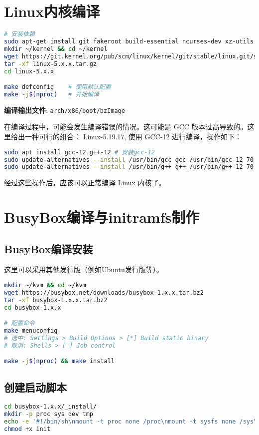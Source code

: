 \section{Linux内核编译}
\begin{lstlisting}[language=bash]
# 安装依赖
sudo apt-get install git fakeroot build-essential ncurses-dev xz-utils libssl-dev bc flex libelf-dev bison
mkdir ~/kernel && cd ~/kernel
wget https://git.kernel.org/pub/scm/linux/kernel/git/stable/linux.git/snapshot/linux-5.x.x.tar.gz
tar -xf linux-5.x.x.tar.gz
cd linux-5.x.x

make defconfig    # 使用默认配置
make -j$(nproc)   # 开始编译
\end{lstlisting}

\textbf{编译输出文件}: \texttt{arch/x86/boot/bzImage}

在编译过程中，可能会发生编译错误的情况。这可能是 GCC 版本过高导致的。这里给出一种可行的组合： Linux-5.19.17, 使用 GCC-12 进行编译，操作如下：

\begin{lstlisting}[language=bash]
sudo apt install gcc-12 g++-12 # 安装gcc-12
sudo update-alternatives --install /usr/bin/gcc gcc /usr/bin/gcc-12 70
sudo update-alternatives --install /usr/bin/g++ g++ /usr/bin/g++-12 70 # 切换 gcc 默认版本
\end{lstlisting}
经过这些操作后，应该可以正常编译 Linux 内核了。

\section{BusyBox编译与initramfs制作}
\subsection{BusyBox编译安装}
这里可以采用其他发行版（例如Ubuntu发行版等）。
\begin{lstlisting}[language=bash]
mkdir ~/kvm && cd ~/kvm
wget https://busybox.net/downloads/busybox-1.x.x.tar.bz2
tar -xf busybox-1.x.x.tar.bz2
cd busybox-1.x.x

# 配置命令
make menuconfig
# 选中: Settings > Build Options > [*] Build static binary
# 取消: Shells > [ ] Job control

make -j$(nproc) && make install
\end{lstlisting}

\subsection{创建启动脚本}
\begin{lstlisting}[language=bash]
cd busybox-1.x.x/_install/
mkdir -p proc sys dev tmp
echo -e '#!/bin/sh\nmount -t proc none /proc\nmount -t sysfs none /sys\nmount -t tmpfs none /tmp\nmount -t devtmpfs none /dev\necho "Hello Linux!"\nexec /bin/sh' > init
chmod +x init
\end{lstlisting}

